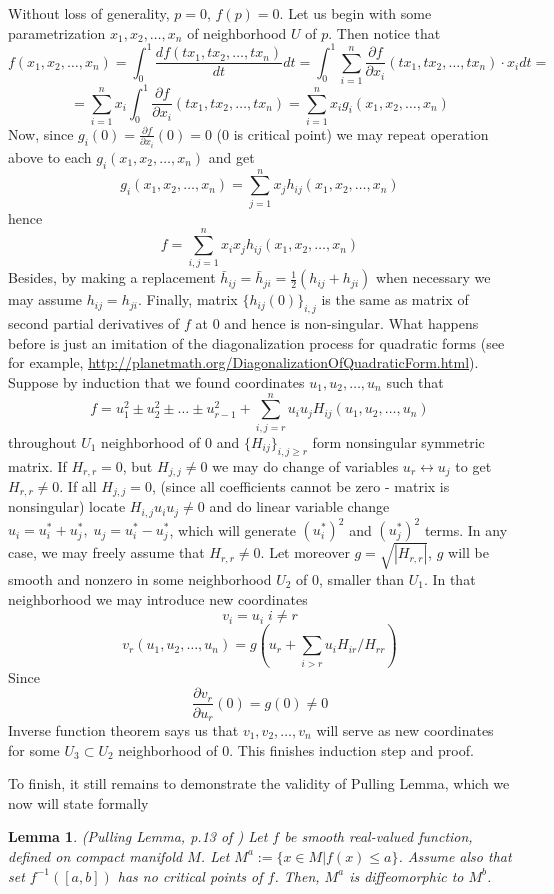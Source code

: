 \documentclass[8pt]{article} %
\newtheorem{lemma}[theorem]{Lemma}
\newenvironment{proof}[1][Proof]{\begin{trivlist}
\item[\hskip \labelsep {\bfseries #1}]}{\qed\end{trivlist}}
\newcommand{\qed}{\nobreak \ifvmode \relax \else
\ifdim\lastskip<1.5em \hskip-\lastskip
\hskip1.5em plus0em minus0.5em \fi \nobreak
  \vrule height0.75em width0.5em depth0.25em\fi}
\begin{document}
\begin{proof}
	Without loss of generality, $p=0$, $f(p)=0$. Let us begin with some parametrization $x_1,x_2,\dots,x_n$ of neighborhood $U$ of $p$. Then notice that
	\[f(x_1,x_2,\dots,x_n)=\int_0^1 \frac{df(tx_1,tx_2,\dots,tx_n)}{dt}dt=\int_0^1\sum_{i=1}^n \frac{\partial f}{\partial x_i}(tx_1,tx_2,\dots,tx_n)\cdot x_i dt=\]
	\[=\sum_{i=1}^n x_i\int_0^1\frac{\partial f}{\partial x_i}(tx_1,tx_2,\dots,tx_n)=\sum_{i=1}^n x_ig_i(x_1,x_2,\dots,x_n)\]
	Now, since $g_i(0)=\frac{\partial f}{\partial x_i}(0)=0$ ($0$ is critical point) we may repeat operation above to each $g_i(x_1,x_2,\dots,x_n)$ and get
	\[g_i(x_1,x_2,\dots,x_n)=\sum_{j=1}^n x_j h_{ij}(x_1,x_2,\dots,x_n)\]
	hence
	\[f=\sum_{i,j=1}^n x_ix_jh_{ij}(x_1,x_2,\dots,x_n)\]
	Besides, by making a replacement $\bar{h}_{ij}=\bar{h}_{ji}=\frac{1}{2}(h_{ij}+h_{ji})$ when necessary we may assume $h_{ij}=h_{ji}$. Finally, matrix $\{h_{ij}(0)\}_{i,j}$ is the same as matrix of second partial derivatives of
	$f$ at $0$ and hence is non-singular. What happens before is just an imitation of the diagonalization process for quadratic forms (see for example, \url{http://planetmath.org/DiagonalizationOfQuadraticForm.html}).\\
	Suppose by induction that we found coordinates $u_1,u_2,\dots,u_n$ such that
	\[f=u_1^2\pm u_2^2\pm \dots\pm u_{r-1}^2+\sum_{i,j=r}^n u_iu_j H_{ij}(u_1,u_2,\dots,u_n)\]
	throughout $U_1$ neighborhood of 0
	and $\{H_{ij}\}_{i,j\geq r}$ form nonsingular symmetric matrix. If $H_{r,r}=0$, but $H_{j,j}\neq 0$ we may do change of variables $u_r\leftrightarrow u_j$ to get $H_{r,r}\neq 0$. If all $H_{j,j}=0$, (since all coefficients
	cannot be zero - matrix is nonsingular) locate $H_{i,j}u_iu_j\neq 0$ and do linear variable change $u_i=u_i^*+u_j^*,\;u_j=u_i^*-u_j^*$, which will generate $(u_i^*)^2$ and $(u_j^*)^2$ terms. In any case, we may freely
	assume that $H_{r,r}\neq 0$. Let moreover $g=\sqrt{|H_{r,r}|}$, $g$ will be smooth and nonzero in some neighborhood $U_2$ of $0$, smaller than $U_1$. 
	In that neighborhood we may introduce new coordinates
	\[v_i=u_i\;i\neq r\]
	\[v_r(u_1,u_2,\dots,u_n)=g(u_r+\sum_{i>r} u_iH_{ir}/H_{rr})\]
	Since 
	\[\frac{\partial v_r}{\partial u_r}(0)=g(0)\neq 0\]
	Inverse function theorem says us that $v_1,v_2,\dots,v_n$ will serve as new coordinates for some $U_3\subset U_2$ neighborhood of $0$. This finishes induction step and proof.
\end{proof}
To finish, it still remains to demonstrate the validity of Pulling Lemma, which we now will state formally
\begin{lemma}{(Pulling Lemma, p.13 of \cite{morseTh}) }
	Let $f$ be smooth real-valued function, defined on compact manifold $M$. Let $M^a:=\{x\in M|f(x)\leq a\}$. Assume also that set $f^{-1}([a,b])$ has no critical points of $f$. Then, $M^a$ is diffeomorphic to $M^b$.
\end{lemma}
\end{document}
